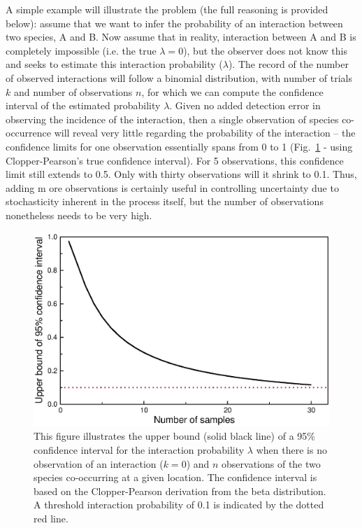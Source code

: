 \documentclass[12pt]{article}
\begin{document}

  A simple example will illustrate the problem (the full reasoning is provided below): assume that we want to infer the probability of an interaction between two species, A and B. Now assume that in reality, interaction between A and B is completely impossible (i.e. the true $\lambda=0$), but the observer does not know this and seeks to estimate this interaction probability ($\lambda$). The record of the number of observed interactions will follow a binomial distribution, with number of trials $k$ and number of observations $n$, for which we can compute the confidence interval of the estimated probability $\lambda$. Given no added detection error in observing the incidence of the interaction, then a single observation of species co-occurrence will reveal very little regarding the probability of the interaction – the confidence limits for one observation essentially spans from 0 to 1 (Fig.~\ref{upper_limits} - using Clopper-Pearson's true confidence interval). For 5 observations, this confidence limit still extends to 0.5. Only with thirty observations will it shrink to 0.1. Thus, adding m ore observations is certainly useful in controlling uncertainty due to stochasticity inherent in the process itself, but the number of observations nonetheless needs to be very high. 

  \begin{figure}
    \caption{This figure illustrates the upper bound (solid black line) of a 95\% confidence interval for the interaction probability $\lambda$ when there is no observation of an interaction ($k = 0$) and $n$ observations of the two species co-occurring at a given location. The confidence interval is based on the Clopper-Pearson derivation from the beta distribution. A threshold interaction probability of 0.1 is indicated by the dotted red line.}
    \label{upper_limits}
    \includegraphics*[width=.8\textwidth]{figures/upper_limit_DG.eps}
  \end{figure}
\end{document}
